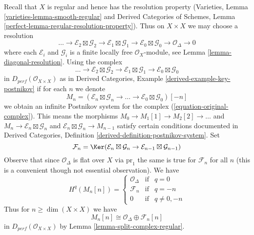 \medskip\noindent
Recall that $X$ is regular and hence has the resolution property
(Varieties, Lemma \ref{varieties-lemma-smooth-regular} and
Derived Categories of Schemes, Lemma
\ref{perfect-lemma-regular-resolution-property}). Thus
on $X \times X$ we may choose a resolution
$$
\ldots \to
\mathcal{E}_2 \boxtimes \mathcal{G}_2 \to
\mathcal{E}_1 \boxtimes \mathcal{G}_1 \to
\mathcal{E}_0 \boxtimes \mathcal{G}_0 \to
\mathcal{O}_\Delta \to 0
$$
where each $\mathcal{E}_i$ and $\mathcal{G}_i$ is a finite locally
free $\mathcal{O}_X$-module, see Lemma \ref{lemma-diagonal-resolution}.
Using the complex
\begin{equation}
\label{equation-original-complex}
\ldots \to
\mathcal{E}_2 \boxtimes \mathcal{G}_2 \to
\mathcal{E}_1 \boxtimes \mathcal{G}_1 \to
\mathcal{E}_0 \boxtimes \mathcal{G}_0
\end{equation}
in $D_{perf}(\mathcal{O}_{X \times X})$ as in
Derived Categories, Example \ref{derived-example-key-postnikov}
if for each $n$ we denote
$$
M_n = (\mathcal{E}_n \boxtimes \mathcal{G}_n \to \ldots \to
\mathcal{E}_0 \boxtimes \mathcal{G}_0)[-n]
$$
we obtain an infinite Postnikov system for the complex
(\ref{equation-original-complex}). This means
the morphisms $M_0 \to M_1[1] \to M_2[2] \to \ldots$ and
$M_n \to \mathcal{E}_n \boxtimes \mathcal{G}_n$ and
$\mathcal{E}_n \boxtimes \mathcal{G}_n \to M_{n - 1}$
satisfy certain conditions documented in
Derived Categories, Definition \ref{derived-definition-postnikov-system}.
Set
$$
\mathcal{F}_n = \Ker(\mathcal{E}_n \boxtimes \mathcal{G}_n \to
\mathcal{E}_{n - 1} \boxtimes \mathcal{G}_{n - 1})
$$
Observe that since $\mathcal{O}_\Delta$ is flat over $X$ via $\text{pr}_1$
the same is true for $\mathcal{F}_n$ for all $n$ (this is a convenient though
not essential observation). We have
$$
H^q(M_n[n]) = \left\{
\begin{matrix}
\mathcal{O}_\Delta & \text{if} & q = 0 \\
\mathcal{F}_n & \text{if} & q = -n \\
0 & \text{if} & q \not = 0, -n
\end{matrix}
\right.
$$
Thus for $n \geq \dim(X \times X)$ we have
$$
M_n[n] \cong \mathcal{O}_\Delta \oplus \mathcal{F}_n[n]
$$
in $D_{perf}(\mathcal{O}_{X \times X})$ by
Lemma \ref{lemma-split-complex-regular}.

